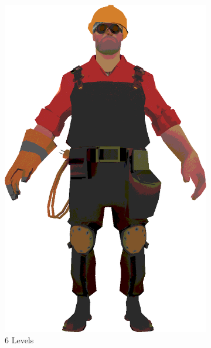 \begin{figure}[h]
\begin{subfigure}[b]{0.14\textwidth}
        \includegraphics[width=\textwidth]{img/textures/CelShadeTexture6.png}
        \caption{6 Levels}
        \label{fig:CelShadeTexture4}
    \end{subfigure}
    ~
    \begin{subfigure}[b]{0.14\textwidth}

\end{subfigure}
\end{figure}
